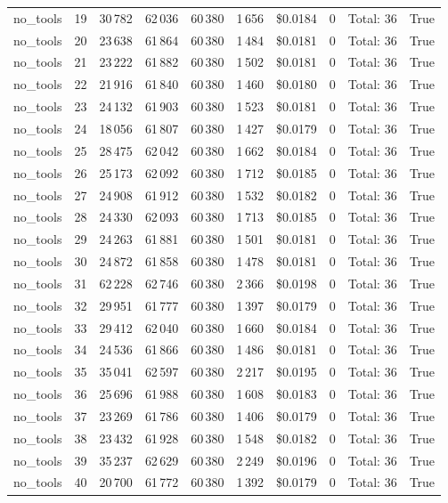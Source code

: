 \documentclass[a4paper,11pt]{article}
\begin{document}
\begin{table}[H]
{\begin{tabular}{l r r r r r r r l r}
no\_tools & 19 & 30\,782 & 62\,036 & 60\,380 & 1\,656 & \$0.0184 & 0 & Total: 36 & True \\
no\_tools & 20 & 23\,638 & 61\,864 & 60\,380 & 1\,484 & \$0.0181 & 0 & Total: 36 & True \\
no\_tools & 21 & 23\,222 & 61\,882 & 60\,380 & 1\,502 & \$0.0181 & 0 & Total: 36 & True \\
no\_tools & 22 & 21\,916 & 61\,840 & 60\,380 & 1\,460 & \$0.0180 & 0 & Total: 36 & True \\
no\_tools & 23 & 24\,132 & 61\,903 & 60\,380 & 1\,523 & \$0.0181 & 0 & Total: 36 & True \\
no\_tools & 24 & 18\,056 & 61\,807 & 60\,380 & 1\,427 & \$0.0179 & 0 & Total: 36 & True \\
no\_tools & 25 & 28\,475 & 62\,042 & 60\,380 & 1\,662 & \$0.0184 & 0 & Total: 36 & True \\
no\_tools & 26 & 25\,173 & 62\,092 & 60\,380 & 1\,712 & \$0.0185 & 0 & Total: 36 & True \\
no\_tools & 27 & 24\,908 & 61\,912 & 60\,380 & 1\,532 & \$0.0182 & 0 & Total: 36 & True \\
no\_tools & 28 & 24\,330 & 62\,093 & 60\,380 & 1\,713 & \$0.0185 & 0 & Total: 36 & True \\
no\_tools & 29 & 24\,263 & 61\,881 & 60\,380 & 1\,501 & \$0.0181 & 0 & Total: 36 & True \\
no\_tools & 30 & 24\,872 & 61\,858 & 60\,380 & 1\,478 & \$0.0181 & 0 & Total: 36 & True \\
no\_tools & 31 & 62\,228 & 62\,746 & 60\,380 & 2\,366 & \$0.0198 & 0 & Total: 36 & True \\
no\_tools & 32 & 29\,951 & 61\,777 & 60\,380 & 1\,397 & \$0.0179 & 0 & Total: 36 & True \\
no\_tools & 33 & 29\,412 & 62\,040 & 60\,380 & 1\,660 & \$0.0184 & 0 & Total: 36 & True \\
no\_tools & 34 & 24\,536 & 61\,866 & 60\,380 & 1\,486 & \$0.0181 & 0 & Total: 36 & True \\
no\_tools & 35 & 35\,041 & 62\,597 & 60\,380 & 2\,217 & \$0.0195 & 0 & Total: 36 & True \\
no\_tools & 36 & 25\,696 & 61\,988 & 60\,380 & 1\,608 & \$0.0183 & 0 & Total: 36 & True \\
no\_tools & 37 & 23\,269 & 61\,786 & 60\,380 & 1\,406 & \$0.0179 & 0 & Total: 36 & True \\
no\_tools & 38 & 23\,432 & 61\,928 & 60\,380 & 1\,548 & \$0.0182 & 0 & Total: 36 & True \\
no\_tools & 39 & 35\,237 & 62\,629 & 60\,380 & 2\,249 & \$0.0196 & 0 & Total: 36 & True \\
no\_tools & 40 & 20\,700 & 61\,772 & 60\,380 & 1\,392 & \$0.0179 & 0 & Total: 36 & True \\
\bottomrule
\end{tabular}}
\end{table}
\end{document}
